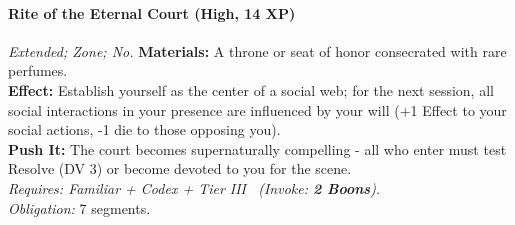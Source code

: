 \paragraph{Rite of the Eternal Court (High, 14 XP)} \emph{Extended; Zone; No.}
\textbf{Materials:} A throne or seat of honor consecrated with rare perfumes. \\
\textbf{Effect:} Establish yourself as the center of a social web; for the next session, all social interactions in your presence are influenced by your will (+1 Effect to your social actions, -1 die to those opposing you). \\
\textbf{Push It:} The court becomes supernaturally compelling - all who enter must test Resolve (DV 3) or become devoted to you for the scene. \\
\emph{Requires: Familiar + Codex + Tier III \ (\textit{Invoke:} \textbf{2 Boons}).} \\
\emph{Obligation:} 7 segments.
